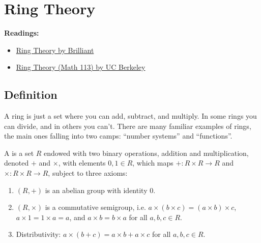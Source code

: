 \chapter{Ring Theory}
\textbf{Readings:}
\begin{itemize}
\item \href{https://brilliant.org/wiki/ring-theory/}{Ring Theory by Brilliant}
\item \href{https://math.berkeley.edu/~gmelvin/math113su14/math113su14notes2.pdf}{Ring Theory (Math 113) by UC Berkeley}
\end{itemize}

\section{Definition}
A ring is just a set where you can add, subtract, and multiply. In some rings you can divide, and in others you can't. There are many familiar examples of rings, the main ones falling into two camps: ``number systems'' and ``functions''.

\begin{definition}
A  is a set $R$ endowed with two binary operations, addition and multiplication, denoted $+$ and $\times$, with elements $0,1\in R$, which maps $+: R \times R \to R$ and $\times: R \times R \to R$, subject to three axioms:
\begin{enumerate}
\item $(R,+)$ is an abelian group with identity $0$.
\item $(R,\times)$ is a commutative semigroup, i.e. $a \times (b \times c) = (a \times b) \times c$, $a \times 1 = 1 \times a = a$, and $a \times b = b \times a$ for all $a, b, c \in R$.
\item Distributivity: $a \times (b + c) = a \times b + a \times c$ for all $a, b, c \in R$.
\end{enumerate}
\end{definition}

